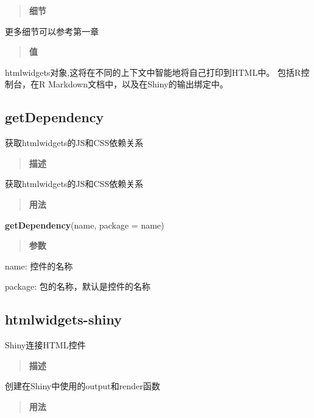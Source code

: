 \documentclass[]{book}
\newenvironment{Shaded}{\begin{snugshade}}{\end{snugshade}}
\newcommand{\KeywordTok}[1]{\textcolor[rgb]{0.13,0.29,0.53}{\textbf{#1}}}
\newcommand{\DataTypeTok}[1]{\textcolor[rgb]{0.13,0.29,0.53}{#1}}
\newcommand{\NormalTok}[1]{#1}
\theoremstyle{definition}
\theoremstyle{definition}
\theoremstyle{definition}
\theoremstyle{remark}
\begin{document}
\begin{quote}
\textbf{细节}
\end{quote}

更多细节可以参考第一章

\begin{quote}
\textbf{值}
\end{quote}

htmlwidgets对象,这将在不同的上下文中智能地将自己打印到HTML中。
包括R控制台，在R Markdown文档中，以及在Shiny的输出绑定中。

\subsection{getDependency}\label{getdependency}

获取htmlwidgets的JS和CSS依赖关系

\begin{quote}
\textbf{描述}
\end{quote}

获取htmlwidgets的JS和CSS依赖关系

\begin{quote}
\textbf{用法}
\end{quote}

\begin{Shaded}
\begin{Highlighting}[]
\KeywordTok{getDependency}\NormalTok{(name, }\DataTypeTok{package =}\NormalTok{ name)}
\end{Highlighting}
\end{Shaded}

\begin{quote}
\textbf{参数}
\end{quote}

name: 控件的名称

package: 包的名称，默认是控件的名称

\subsection{htmlwidgets-shiny}\label{htmlwidgets-shiny}

Shiny连接HTML控件

\begin{quote}
\textbf{描述}
\end{quote}

创建在Shiny中使用的output和render函数

\begin{quote}
\textbf{用法}
\end{quote}
\end{document}
